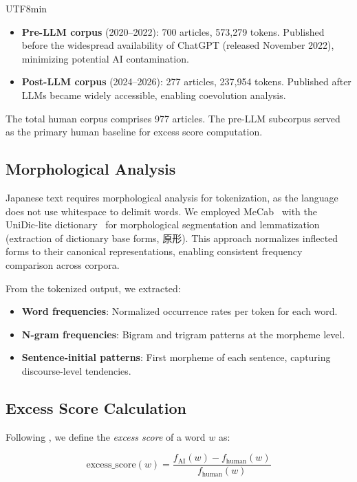 \documentclass[11pt,a4paper]{article}
\begin{document}
\begin{CJK}{UTF8}{min}
\begin{itemize}
    \item \textbf{Pre-LLM corpus} (2020--2022): 700 articles, 573,279 tokens. Published before the widespread availability of ChatGPT (released November 2022), minimizing potential AI contamination.
    \item \textbf{Post-LLM corpus} (2024--2026): 277 articles, 237,954 tokens. Published after LLMs became widely accessible, enabling coevolution analysis.
\end{itemize}

The total human corpus comprises 977 articles. The pre-LLM subcorpus served as the primary human baseline for excess score computation.

\subsection{Morphological Analysis}

Japanese text requires morphological analysis for tokenization, as the language does not use whitespace to delimit words. We employed MeCab~\citep{kudo2006mecab} with the UniDic-lite dictionary~\citep{unidic2021} for morphological segmentation and lemmatization (extraction of dictionary base forms, 原形). This approach normalizes inflected forms to their canonical representations, enabling consistent frequency comparison across corpora.

From the tokenized output, we extracted:
\begin{itemize}
    \item \textbf{Word frequencies}: Normalized occurrence rates per token for each word.
    \item \textbf{N-gram frequencies}: Bigram and trigram patterns at the morpheme level.
    \item \textbf{Sentence-initial patterns}: First morpheme of each sentence, capturing discourse-level tendencies.
\end{itemize}

\subsection{Excess Score Calculation}

Following \citet{kobak2024vocabulary}, we define the \textit{excess score} of a word $w$ as:

\begin{equation}
    \text{excess\_score}(w) = \frac{f_{\text{AI}}(w) - f_{\text{human}}(w)}{f_{\text{human}}(w)}
\end{equation}


\end{CJK}
\end{document}
